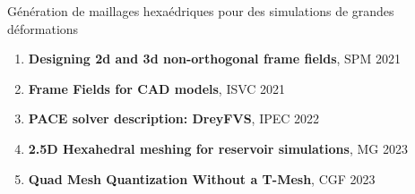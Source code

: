 \documentclass{beamer}
\begin{document}
\begin{frame}{Génération de maillages hexaédriques pour des simulations de grandes déformations}
    \centering
    \small
    \begin{enumerate}
        \item \textbf{Designing 2d and 3d non-orthogonal frame fields}, SPM 2021
        \item \textbf{Frame Fields for CAD models}, ISVC 2021
        \item \textbf{PACE solver description: DreyFVS}, IPEC 2022
        \item \textbf{2.5D Hexahedral meshing for reservoir simulations}, MG 2023
        \item \textbf{Quad Mesh Quantization Without a T-Mesh}, CGF 2023
    \end{enumerate}
\end{frame}
\fi
\end{document}
